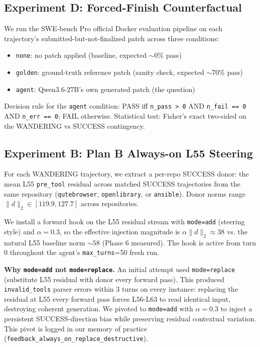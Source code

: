 \documentclass[11pt]{article}
\begin{document}
\subsection{Experiment D: Forced-Finish Counterfactual}

We run the SWE-bench Pro official Docker evaluation pipeline on each trajectory's submitted-but-not-finalized patch across three conditions:

\begin{itemize}
\item \texttt{none}: no patch applied (baseline, expected $\sim$0\% pass)
\item \texttt{golden}: ground-truth reference patch (sanity check, expected $\sim$70\% pass)
\item \texttt{agent}: Qwen3.6-27B's own generated patch (the question)
\end{itemize}

Decision rule for the \texttt{agent} condition: PASS iff \texttt{n\_pass > 0} AND \texttt{n\_fail == 0} AND \texttt{n\_err == 0}; FAIL otherwise. Statistical test: Fisher's exact two-sided on the WANDERING vs SUCCESS contingency.

\subsection{Experiment B: Plan B Always-on L55 Steering}\label{sec:exp_b_method}

For each WANDERING trajectory, we extract a per-repo SUCCESS donor: the mean L55 \texttt{pre\_tool} residual across matched SUCCESS trajectories from the same repository (\texttt{qutebrowser}, \texttt{openlibrary}, or \texttt{ansible}). Donor norms range $\|d\|_2 \in [119.9, 127.7]$ across repositories.

We install a forward hook on the L55 residual stream with \texttt{mode=add} (steering style) and $\alpha=0.3$, so the effective injection magnitude is $\alpha \|d\|_2 \approx 38$ vs. the natural L55 baseline norm $\sim 58$ (Phase 6 measured). The hook is active from turn 0 throughout the agent's \texttt{max\_turns}=50 fresh run.

\textbf{Why \texttt{mode=add} not \texttt{mode=replace}.} An initial attempt used \texttt{mode=replace} (substitute L55 residual with donor every forward pass). This produced \texttt{invalid\_tools} parser errors within 3 turns on every instance: replacing the residual at L55 every forward pass forces L56-L63 to read identical input, destroying coherent generation. We pivoted to \texttt{mode=add} with $\alpha=0.3$ to inject a persistent SUCCESS-direction bias while preserving residual contextual variation. This pivot is logged in our memory of practice (\texttt{feedback\_always\_on\_replace\_destructive}).
\end{document}
